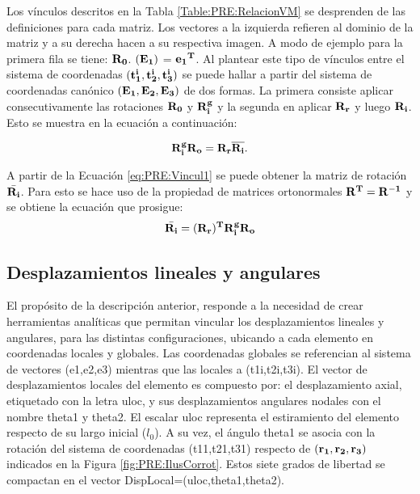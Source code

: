 Los vínculos descritos en la Tabla \ref{Table:PRE:RelacionVM} se desprenden de las definiciones para cada matriz. Los vectores a la izquierda refieren al dominio de la matriz y a su derecha hacen a su respectiva imagen. A modo de ejemplo para la primera fila se tiene: $\bf{R}_0$. $(\bf{E_1})$ = $\bf{e_1}^T$. Al plantear este tipo de vínculos entre el sistema de coordenadas $(\bf{t_1^i},\bf{t_2^i},\bf{t_3^i})$ se puede hallar a partir del sistema de coordenadas canónico $(\bf{E_1},\bf{E_2},\bf{E_3})$ de dos formas. La primera consiste aplicar consecutivamente las rotaciones $\bf{R}_0$ y $\bf{R}_i^g$ y la segunda en aplicar $\bf{R_r}$ y luego ${\bf{R_i}}$. Esto se muestra en la ecuación a continuación: 

\begin{equation}
	\label{eq:PRE:Vincul1}
	\bf{R_i^g}\bf{R_o}= \bf{R_r}\overline{\bf{R_i}}.
\end{equation}

A partir de la Ecuación \eqref{eq:PRE:Vincul1} se puede obtener la matriz de rotación $\bar{\bf{R_i}}$. Para esto se hace uso de la propiedad de matrices ortonormales $\bf{R}^T=\bf{R}^{-1}$ y se obtiene la ecuación que prosigue: 
\begin{equation}
	\label{eq:PRE:Vincul2}
	\bar{\bf{R_i}}=(\bf{R_r})^T\bf{R_i^g}\bf{R_o}\\
\end{equation}


\subsection{Desplazamientos lineales y angulares}

El propósito de la descripción anterior, responde a la necesidad de crear herramientas analíticas que permitan vincular los desplazamientos lineales y angulares, para las distintas configuraciones, ubicando a cada elemento en coordenadas locales y globales. Las coordenadas globales se referencian al sistema de vectores (\gls{e1},\gls{e2},\gls{e3}) mientras que las locales a (\gls{t1i},\gls{t2i},\gls{t3i}). El vector de desplazamientos locales del elemento es compuesto por: el desplazamiento axial, etiquetado con la letra \gls{uloc}, y sus desplazamientos angulares nodales con el nombre \gls{theta1} y \gls{theta2}. El escalar \gls{uloc} representa el estiramiento del elemento respecto de su largo inicial ($l_0$). A su vez, el ángulo \gls{theta1} se asocia con la rotación del sistema de coordenadas (\gls{t11},\gls{t21},\gls{t31}) respecto de $(\bf{r_1},\bf{r_2},\bf{r_3})$ indicados en la Figura \ref{fig:PRE:IlusCorrot}. Estos siete grados de libertad se compactan en el vector \gls{DispLocal}=(\gls{uloc},\gls{theta1},\gls{theta2}). 


